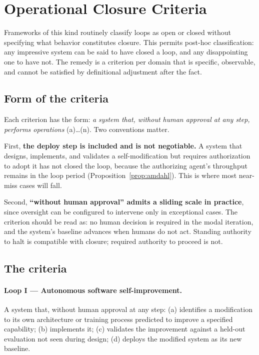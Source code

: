 \documentclass[11pt]{article}
\begin{document}
\section{Operational Closure Criteria}
\label{sec:criteria}

Frameworks of this kind routinely classify loops as open or closed without specifying what behavior constitutes closure. This permits post-hoc classification: any impressive system can be said to have closed a loop, and any disappointing one to have not. The remedy is a criterion per domain that is specific, observable, and cannot be satisfied by definitional adjustment after the fact.

\subsection{Form of the criteria}

Each criterion has the form: \emph{a system that, without human approval at any step, performs operations} (a)\dots(n). Two conventions matter.

First, \textbf{the deploy step is included and is not negotiable.} A system that designs, implements, and validates a self-modification but requires authorization to adopt it has not closed the loop, because the authorizing agent's throughput remains in the loop period (Proposition~\ref{prop:amdahl}). This is where most near-miss cases will fall.

Second, \textbf{``without human approval'' admits a sliding scale in practice}, since oversight can be configured to intervene only in exceptional cases. The criterion should be read as: no human decision is required in the modal iteration, and the system's baseline advances when humans do not act. Standing authority to halt is compatible with closure; required authority to proceed is not.

\subsection{The criteria}

\paragraph{Loop I --- Autonomous software self-improvement.} A system that, without human approval at any step: (a) identifies a modification to its own architecture or training process predicted to improve a specified capability; (b) implements it; (c) validates the improvement against a held-out evaluation not seen during design; (d) deploys the modified system as its new baseline.
\end{document}
